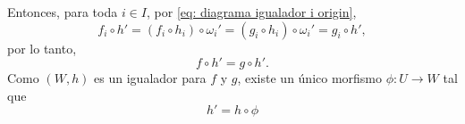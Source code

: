 \documentclass[10pt]{article}
\newtheorem[M]{teo}{Teorema}[section]
\newtheorem[M]{listaObj}[teo]{Lista de deseos}
\newtheorem[M]{preg}[teo]{Pregunta}
\newtheorem[M]{lema}[teo]{Lema}
\newtheorem[M]{hip}[teo]{Hipótesis}
\newtheorem[M]{prop}[teo]{Proposición}
\newtheorem[M]{obs}[teo]{Observación}
\newtheorem[M]{cor}[teo]{Corolario}
\newtheorem[M]{notacion}[teo]{Notación}
\newtheorem[M]{nota}[teo]{Nota}
\begin{document}
Entonces, para toda $i \in I$,
por \eqref{eq: diagrama igualador i origin},
\begin{equation}
	\label{eq: fi circ h' igual gi circ h'}
f_{i} \circ h' = (f_{i} \circ h_{i}) \circ \omega_{i}' 
= (g_{i} \circ h_{i}) \circ \omega_{i}' = g_{i} \circ h',
\end{equation}
por lo tanto,
\begin{equation}
	\label{eq: f circ h' g circ h'}
	f \circ h' = g \circ h'. 
\end{equation}
Como $(W, h)$ es un igualador para $f$ y $g$, existe un único
morfismo $\phi : U \longrightarrow W$ tal que 
\begin{equation}
	\label{ eq: h' igual h circ phi}
	h' = h \circ \phi
\end{equation}
\begin{center}
\begin{tikzpicture}[x=0.75pt,y=0.75pt,yscale=-1,xscale=1]



\end{tikzpicture}
\end{center}
\end{document}
